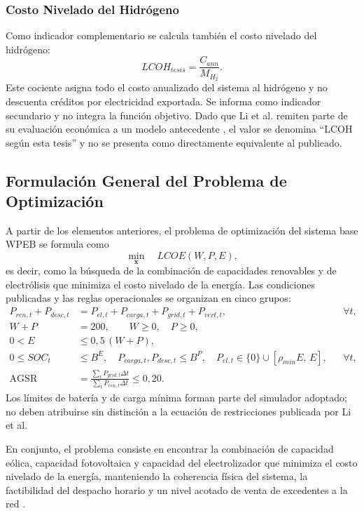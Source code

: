 \subsubsection{Costo Nivelado del Hidrógeno}

Como indicador complementario se calcula también el costo nivelado del hidrógeno:
\begin{equation}
LCOH_{tesis}=\frac{C_{ann}}{M_{H_2}}.
\end{equation}
Este cociente asigna todo el costo anualizado del sistema al hidrógeno y no descuenta créditos por electricidad exportada. Se informa como indicador secundario y no integra la función objetivo. Dado que Li et al. remiten parte de su evaluación económica a un modelo antecedente \cite{Li2023TechnoEconomic}, el valor se denomina ``LCOH según esta tesis'' y no se presenta como directamente equivalente al publicado.

\subsection{Formulación General del Problema de Optimización}

A partir de los elementos anteriores, el problema de optimización del sistema base WPEB se formula como \cite{Li2024WPEB}
\begin{equation}
\min_{\mathbf{x}} \quad LCOE(W,P,E),
\end{equation}
es decir, como la búsqueda de la combinación de capacidades renovables y de electrólisis que minimiza el costo nivelado de la energía. Las condiciones publicadas y las reglas operacionales se organizan en cinco grupos:
\begin{align}
P_{ren,t}+P_{desc,t}&=P_{el,t}+P_{carga,t}+P_{grid,t}+P_{vert,t}, &&\forall t,\\
W+P&=200,\qquad W\geq0,\quad P\geq0,\\
0<E&\leq0{,}5\,(W+P),\\
0\leq SOC_t&\leq B^E,\quad
P_{carga,t},P_{desc,t}\leq B^P,\quad
P_{el,t}\in\{0\}\cup\left[\rho_{min}E,\,E\right], &&\forall t,\\
\mathrm{AGSR}&=\frac{\sum_tP_{grid,t}\Delta t}{\sum_tP_{ren,t}\Delta t}\leq0{,}20.
\end{align}
Los límites de batería y de carga mínima forman parte del simulador adoptado; no deben atribuirse sin distinción a la ecuación de restricciones publicada por Li et al.

En conjunto, el problema consiste en encontrar la combinación de capacidad eólica, capacidad fotovoltaica y capacidad del electrolizador que minimiza el costo nivelado de la energía, manteniendo la coherencia física del sistema, la factibilidad del despacho horario y un nivel acotado de venta de excedentes a la red \cite{Li2024WPEB}.

